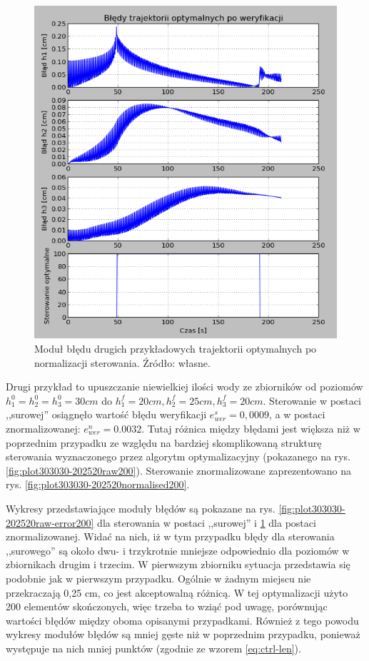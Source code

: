 \begin{figure}[htp]
    \centering
    \includegraphics{Grafika/plot_30_30_30-20_25_20_normalised-error_200}
    \caption{Moduł błędu drugich przykładowych trajektorii optymalnych po normalizacji sterowania. Źródło: własne.}
    \label{fig:plot303030-202520normalised-error200}
\end{figure}


Drugi przykład to upuszczanie niewielkiej ilości wody ze zbiorników od poziomów $h_{1}^{0} = h_{2}^{0} = h_{3}^{0} = 30 cm$ do $h_{1}^{f} = 20 cm, h_{2}^{f} = 25 cm, h_{3}^{f} = 20 cm$. Sterowanie w postaci ,,surowej'' osiągnęło wartość błędu weryfikacji $e_{wer}^{s} = 0,0009$, a w postaci znormalizowanej: $e_{wer}^{n} = 0.0032$. Tutaj różnica między błędami jest większa niż w poprzednim przypadku ze względu na bardziej skomplikowaną strukturę sterowania wyznaczonego przez algorytm optymalizacyjny (pokazanego na rys. \ref{fig:plot303030-202520raw200}). Sterowanie znormalizowane zaprezentowano na rys. \ref{fig:plot303030-202520normalised200}.

Wykresy przedstawiające moduły błędów są pokazane na rys. \ref{fig:plot303030-202520raw-error200} dla sterowania w postaci ,,surowej'' i \ref{fig:plot303030-202520normalised-error200} dla postaci znormalizowanej.
Widać na nich, iż w tym przypadku błędy dla sterowania ,,surowego'' są około dwu- i trzykrotnie mniejsze odpowiednio dla poziomów w zbiornikach drugim i trzecim. W pierwszym zbiorniku sytuacja przedstawia się podobnie jak w pierwszym przypadku. Ogólnie w żadnym miejscu nie przekraczają 0,25 cm, co jest akceptowalną różnicą.
W tej optymalizacji użyto 200 elementów skończonych, więc trzeba to wziąć pod uwagę, porównując wartości błędów między oboma opisanymi przypadkami. Również z tego powodu wykresy modułów błędów są mniej gęste niż w poprzednim przypadku, ponieważ występuje na nich mniej punktów (zgodnie ze wzorem \ref{eq:ctrl-len}).


